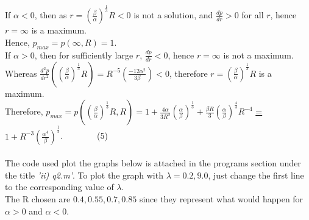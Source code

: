 \documentclass[10pt]{article}
\begin{document}
If $\alpha<0$, then as $r=(\frac{\beta}{\alpha})^{\frac{1}{3}}R<0$ is not a solution, and $\frac{dp}{dr}>0$ for all $r$, hence $r=\infty$ is a maximum.\\
Hence, \underline{$p_{max}=p(\infty,R)=1$}.\\
If $\alpha>0$, then for sufficiently large $r$, $\frac{dp}{dr}<0$, hence $r=\infty$ is not a maximum.\\
Whereas $\frac{d^2p}{dr^2}((\frac{\beta}{\alpha})^{\frac{1}{3}}R)=R^{-5}(\frac{-12\alpha^2}{3\beta})<0$, therefore $r=(\frac{\beta}{\alpha})^{\frac{1}{3}}R$ is a maximum.\\
Therefore, \underline{$p_{max}$}$=p((\frac{\beta}{\alpha})^{\frac{1}{3}}R,R)=1+\frac{4\alpha}{3R^3}(\frac{\alpha}{\beta})^{\frac{1}{3}}+\frac{\beta R}{3}(\frac{\alpha}{\beta})^{\frac{4}{3}}R^{-4}$ \underline{=$1+R^{-3}(\frac{\alpha^4}{\beta})^{\frac{1}{3}}$}.$\qquad\qquad$(5)\\\\
The code used plot the graphs below is attached in the programs section under the title \emph{'ii) q2.m'}. To plot the graph with $\lambda=0.2,9.0$, just change the first line to the corresponding value of $\lambda$.\\ The R chosen are $0.4,0.55,0.7,0.85$ since they represent what would happen for $\alpha>0$ and $\alpha<0$.\\
\end{document}
